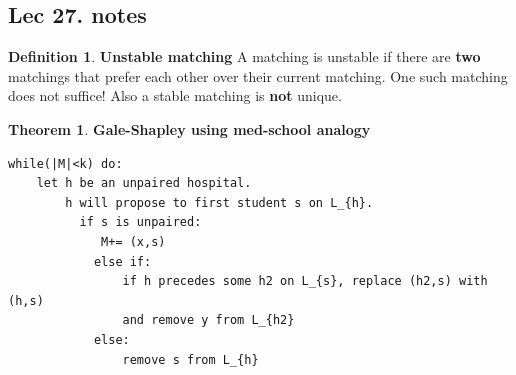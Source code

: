 \documentclass[titlepage]{article}
\theoremstyle{definition}
\newtheorem{theorem}{Theorem}[section]
\newtheorem{definition}{Definition}
\numberwithin{equation}{subsection}
\numberwithin{remark}{subsection}
\begin{document}
\subsection{Lec 27. notes}

\begin{definition}\textbf{Unstable matching}
A matching is unstable if there are \textbf{two} matchings that prefer each other over their current matching. One such matching does not suffice! Also a stable matching is \textbf{not} unique. 
\end{definition}

\begin{theorem}\textbf{Gale-Shapley using med-school analogy}
\begin{verbatim}
while(|M|<k) do:
    let h be an unpaired hospital.
        h will propose to first student s on L_{h}.
          if s is unpaired:
             M+= (x,s)
            else if:
                if h precedes some h2 on L_{s}, replace (h2,s) with (h,s) 
                and remove y from L_{h2}
            else:
                remove s from L_{h}
\end{verbatim}

\end{theorem}
\end{document}
